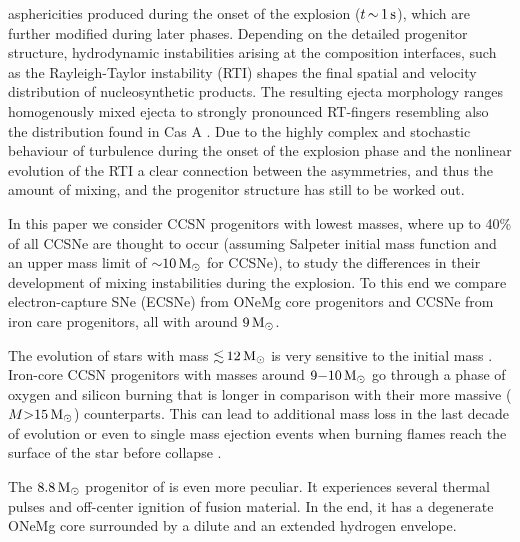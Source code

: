 \documentclass[fleqn,usenatbib]{mnras}
\newcommand{\solm}{\ensuremath{\rm{M_{\odot}}}\xspace}
\begin{document}
asphericities produced during the onset of the explosion ($t\,\mathord{\sim}\, 1\, \rm s$), which are further modified during later phases. Depending on the detailed progenitor structure, hydrodynamic instabilities arising at the composition interfaces, such as the Rayleigh-Taylor instability (RTI) shapes the final spatial and velocity distribution of nucleosynthetic products. The resulting ejecta morphology ranges homogenously mixed ejecta to strongly pronounced RT-fingers resembling also the  distribution found in Cas A \citep{Wongwathanarat2017,Grefenstette2017}. Due to the highly complex and stochastic behaviour of turbulence during the onset of the explosion phase and the nonlinear evolution of the RTI a clear connection between the asymmetries, and thus the amount of mixing, and the progenitor structure has still to be worked out.

In this paper we consider CCSN progenitors with lowest masses, where up to 40\% of all CCSNe are thought to occur (assuming Salpeter initial mass function  \citep{Salpeter1955} and an upper mass limit of $\mathord{\sim}10\,\solm$ for CCSNe), to study the differences in their development of mixing instabilities during the explosion. To this end we compare electron-capture SNe (ECSNe) from ONeMg core progenitors and CCSNe from iron care progenitors, all with around $9\,\solm$. 

The evolution of stars with mass $\mathord{\lesssim}\,12\, \solm$ is very sensitive to the initial mass \citep{Woosley2015}.
Iron-core CCSN progenitors with masses around $9\mathord{-}10\,\solm$ go through a phase of oxygen and silicon burning that is longer in comparison with their more massive ($M \mathord{>} 15\, \solm$) counterparts. This can lead to additional mass loss in the last decade of evolution or even to single mass ejection events when burning flames reach the surface of the star before collapse \citet{Woosley2015}.

The $8.8\, \solm$ progenitor of \cite{Nomoto1984} is even more peculiar. It experiences  several thermal pulses and off-center ignition of fusion material. In the end, it has a degenerate ONeMg core surrounded by a dilute and an extended hydrogen envelope.
 
\end{document}
